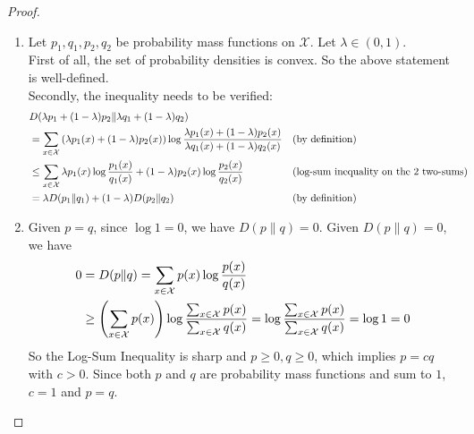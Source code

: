 \begin{proof}
    \begin{enumerate}
        \item
            Let $p_1, q_1, p_2, q_2$ be probability mass functions on $\mathcal{X}$.
            Let $\lambda \in (0, 1)$. \\
            First of all, the set of probability densities is convex. 
            So the above statement is well-defined. \\
            Secondly, the inequality needs to be verified:
            \begin{align*}
                &D(\lambda p_1 + (1-\lambda) p_2 \| \lambda q_1 + (1-\lambda) q_2) \\
                &= \sum_{x \in \mathcal{X}}{\left(\lambda p_1(x) + (1-\lambda) p_2(x)\right) \log \frac{\lambda p_1(x) + (1-\lambda) p_2(x)}{\lambda q_1(x) + (1-\lambda) q_2(x)}}      
                && \text{(by definition)} \\
                &\le \sum_{x \in \mathcal{X}}{\lambda p_1(x) \log \frac{p_1(x)}{q_1(x)} + (1-\lambda) p_2(x) \log \frac{p_2(x)}{q_2(x)}}        && \text{(log-sum inequality on the 2 two-sums)} \\
                &= \lambda D(p_1 \| q_1) + (1-\lambda) D(p_2 \| q_2)                                                                            && \text{(by definition)}
            \end{align*}
	
        \item
            Given $p = q$, since $\log 1 = 0$, we have $D(p \| q) = 0$.
            Given $D(p \| q) = 0$, we have
            \begin{align*}
                0 &= D(p \| q) = \sum_{x \in \mathcal{X}}{p(x) \log \frac{p(x)}{q(x)}} \\
                &\ge \left(\sum_{x \in \mathcal{X}}{p(x)}\right) \log \frac{\sum_{x \in \mathcal{X}}{p(x)}}{\sum_{x \in \mathcal{X}}{q(x)}} 
                = \log \frac{\sum_{x \in \mathcal{X}}{p(x)}}{\sum_{x \in \mathcal{X}}{q(x)}} 
                = \log 1 = 0
            \end{align*}
            So the Log-Sum Inequality is sharp and $p \ge 0, q \ge 0$, which implies $p = c q$ with $c > 0$.
            Since both $p$ and $q$ are probability mass functions and sum to $1$, $c = 1$ and $p = q$.


\end{enumerate}
\end{proof}
